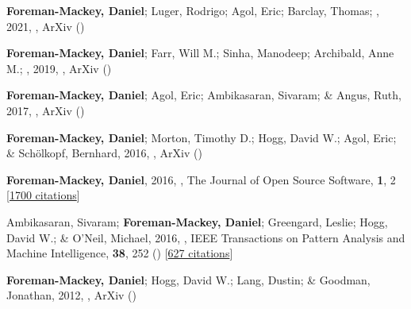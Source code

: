 \item[{\color{numcolor}\scriptsize7}] \textbf{Foreman-Mackey, Daniel}; Luger, Rodrigo; Agol, Eric; Barclay, Thomas; \etal, 2021, , ArXiv ()

\item[{\color{numcolor}\scriptsize6}] \textbf{Foreman-Mackey, Daniel}; Farr, Will M.; Sinha, Manodeep; Archibald, Anne M.; \etal, 2019, , ArXiv ()

\item[{\color{numcolor}\scriptsize5}] \textbf{Foreman-Mackey, Daniel}; Agol, Eric; Ambikasaran, Sivaram; \& Angus, Ruth, 2017, , ArXiv ()

\item[{\color{numcolor}\scriptsize4}] \textbf{Foreman-Mackey, Daniel}; Morton, Timothy D.; Hogg, David W.; Agol, Eric; \& Sch{\"o}lkopf, Bernhard, 2016, , ArXiv ()

\item[{\color{numcolor}\scriptsize3}] \textbf{Foreman-Mackey, Daniel}, 2016, , The Journal of Open Source Software, \textbf{1}, 2 [\href{https://scholar.google.com/scholar?cites=1835087844145558435,17325274697099535179,14220488595059618709,12820425635803494730,7284810048757141243,17415935839493019063}{1700 citations}]

\item[{\color{numcolor}\scriptsize2}] Ambikasaran, Sivaram; \textbf{Foreman-Mackey, Daniel}; Greengard, Leslie; Hogg, David W.; \& O'Neil, Michael, 2016, , IEEE Transactions on Pattern Analysis and Machine Intelligence, \textbf{38}, 252 () [\href{https://scholar.google.com/scholar?cites=7122560326210979193,5194420368165307096,3347404430934682534}{627 citations}]

\item[{\color{numcolor}\scriptsize1}] \textbf{Foreman-Mackey, Daniel}; Hogg, David W.; Lang, Dustin; \& Goodman, Jonathan, 2012, , ArXiv ()
